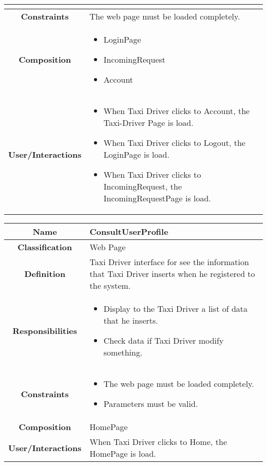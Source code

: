 \documentclass[11pt, a4paper,titlepage]{article}
\begin{document}
\begin{enumerate}
\begin{tabularx}{\textwidth}{| c | X |}
\begin{itemize}
	\end{itemize}
	\\
	\hline
	\textbf{Constraints} & The web page must be loaded completely.
	\\
	\hline
	\textbf{Composition} &
	\begin{itemize}
		\item LoginPage
		\item IncomingRequest
		\item Account
	\end{itemize}
	\\
	\hline
	\textbf{User/Interactions} &
	\begin{itemize}
		\item When Taxi Driver clicks to Account, the Taxi-Driver Page is load.    	
		\item When Taxi Driver clicks to Logout, the LoginPage is load.
		\item When Taxi Driver clicks to IncomingRequest, the IncomingRequestPage is load.
	\end{itemize}
	\\
	\hline 
\end{tabularx}
\begin{tabularx}{\textwidth}{| c | X |}
	\hline
	\textbf{Name} &
	ConsultUserProfile
	\\
	\hline
	\textbf{Classification} &
	Web Page
	\\
	\hline
	\textbf{Definition} &
	Taxi Driver interface for see the information that Taxi Driver inserts when he registered to the system.\\
	\hline
	\textbf{Responsibilities} &
	\begin{itemize}
		\item Display to the Taxi Driver a list of data that he inserts.
		\item Check data if Taxi Driver modify something.
	\end{itemize}
	\\
	\hline
	\textbf{Constraints} &
	\begin{itemize}
		\item  The web page must be loaded completely.
		\item Parameters must be valid.
	\end{itemize}
	\\
	\hline
	\textbf{Composition} & HomePage
	\\
	\hline
	\textbf{User/Interactions} &
	When Taxi Driver clicks to Home, the HomePage is load.
	\\
	\hline 
\end{tabularx}


\end{enumerate}
\end{document}
